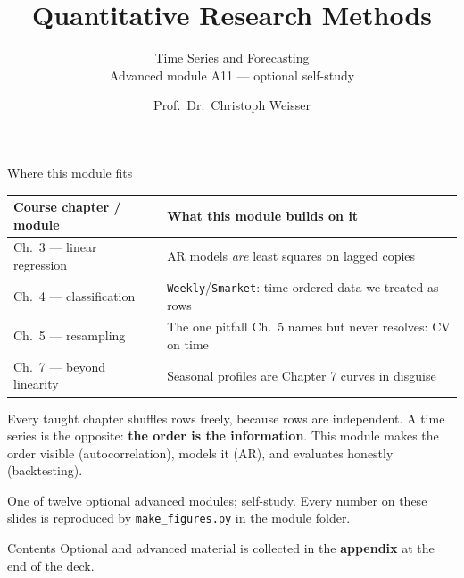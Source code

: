 \documentclass[aspectratio=169,11pt]{beamer}
\title{Quantitative Research Methods}
\subtitle{Time Series and Forecasting\\[2pt]{\small Advanced module A11 --- optional self-study}}
\author{Prof.\ Dr.\ Christoph Weisser}
\date{}\graphicspath{{images/}}
\begin{document}
\begin{frame}[plain]\titlepage\end{frame}

\begin{frame}{Where this module fits}
  \footnotesize
  \begin{center}
  \begin{tabular}{@{}p{3.9cm}p{8.4cm}@{}}
    \toprule
    \textbf{Course chapter / module} & \textbf{What this module builds on it} \\
    \midrule
    Ch.\ 3 --- linear regression & AR models \emph{are} least squares on lagged copies \\
    Ch.\ 4 --- classification & \texttt{Weekly}/\texttt{Smarket}: time-ordered data we treated as rows \\
    Ch.\ 5 --- resampling & The one pitfall Ch.\ 5 names but never resolves: CV on time \\
    Ch.\ 7 --- beyond linearity & Seasonal profiles are Chapter 7 curves in disguise \\
    \bottomrule
  \end{tabular}
  \end{center}
  \vspace{2pt}
  \begin{takeaway}
    Every taught chapter shuffles rows freely, because rows are independent. A time
    series is the opposite: \textbf{the order is the information}. This module makes
    the order visible (autocorrelation), models it (AR), and evaluates honestly
    (backtesting).
  \end{takeaway}
  {\scriptsize One of twelve optional advanced modules; self-study. Every number on
  these slides is reproduced by \texttt{make\_figures.py} in the module folder.}
\end{frame}

\begin{frame}{Contents}\small\tableofcontents[hideallsubsections]
  \vfill
  {\tiny Optional and advanced material is collected in the \textbf{appendix} at the end of the deck.}
\end{frame}
\end{document}
